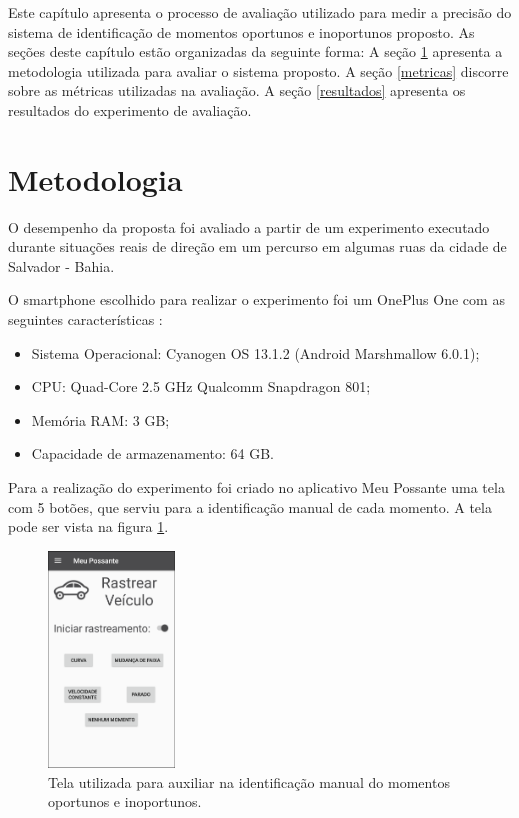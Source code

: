 \label{estudo-experimental}

Este capítulo apresenta o processo de avaliação utilizado para medir a precisão do
sistema de identificação de momentos oportunos e inoportunos proposto. As seções deste
capítulo estão organizadas da seguinte forma: A seção \ref{metodologia} apresenta a metodologia
utilizada para avaliar o sistema proposto. A seção \ref{metricas} discorre sobre as métricas
utilizadas na avaliação. A seção \ref{resultados} apresenta os resultados do experimento de
avaliação.

\section{Metodologia}
\label{metodologia}

O desempenho da proposta foi avaliado a partir de um experimento executado durante
situações reais de direção em um percurso em algumas ruas da cidade de Salvador -
Bahia.

O smartphone escolhido para realizar o experimento foi um OnePlus One com as seguintes características
\cite{oneplusone}:

\begin{itemize}
  \item Sistema Operacional: Cyanogen OS 13.1.2 (Android Marshmallow 6.0.1);
  \item CPU: Quad-Core 2.5 GHz Qualcomm Snapdragon 801;
  \item Memória RAM: 3 GB;
  \item Capacidade de armazenamento: 64 GB.
\end{itemize}

Para a realização do experimento foi criado no aplicativo Meu Possante uma tela com 5 botões, que serviu
para a identificação manual de cada momento. A tela pode ser vista na figura \ref{tela-experimento}.

\begin{figure}[h]
\centering
\includegraphics[width=0.3\textwidth]{images/tela-experimento.png}
\caption{Tela utilizada para auxiliar na identificação manual do momentos oportunos e inoportunos.}
\label{tela-experimento}
\end{figure}

